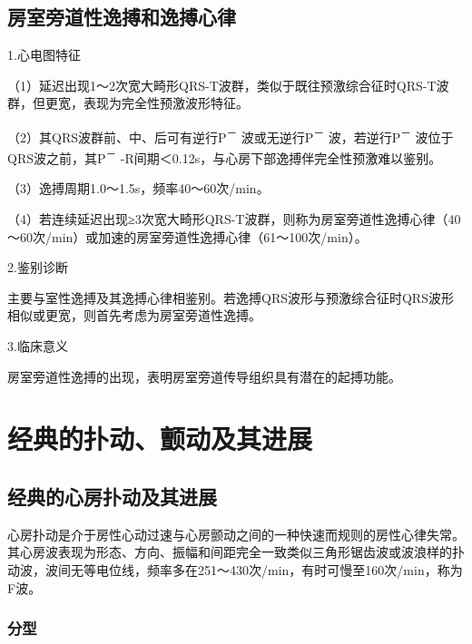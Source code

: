 \protect\hypertarget{text00019.htmlux5cux23subid190}{}{}

\section{房室旁道性逸搏和逸搏心律}

1.心电图特征

（1）延迟出现1～2次宽大畸形QRS-T波群，类似于既往预激综合征时QRS-T波群，但更宽，表现为完全性预激波形特征。

（2）其QRS波群前、中、后可有逆行P\textsuperscript{－}
波或无逆行P\textsuperscript{－} 波，若逆行P\textsuperscript{－}
波位于QRS波之前，其P\textsuperscript{－}
-R间期＜0.12s，与心房下部逸搏伴完全性预激难以鉴别。

（3）逸搏周期1.0～1.5s，频率40～60次/min。

（4）若连续延迟出现≥3次宽大畸形QRS-T波群，则称为房室旁道性逸搏心律（40～60次/min）或加速的房室旁道性逸搏心律（61～100次/min）。

2.鉴别诊断

主要与室性逸搏及其逸搏心律相鉴别。若逸搏QRS波形与预激综合征时QRS波形相似或更宽，则首先考虑为房室旁道性逸搏。

3.临床意义

房室旁道性逸搏的出现，表明房室旁道传导组织具有潜在的起搏功能。

\protect\hypertarget{text00020.html}{}{}

\protect\hypertarget{text00020.htmlux5cux23chapter20}{}{}

\chapter{经典的扑动、颤动及其进展}

\protect\hypertarget{text00020.htmlux5cux23subid191}{}{}

\section{经典的心房扑动及其进展}

心房扑动是介于房性心动过速与心房颤动之间的一种快速而规则的房性心律失常。其心房波表现为形态、方向、振幅和间距完全一致类似三角形锯齿波或波浪样的扑动波，波间无等电位线，频率多在251～430次/min，有时可慢至160次/min，称为F波。

\protect\hypertarget{text00020.htmlux5cux23subid192}{}{}

\subsection{分型}


